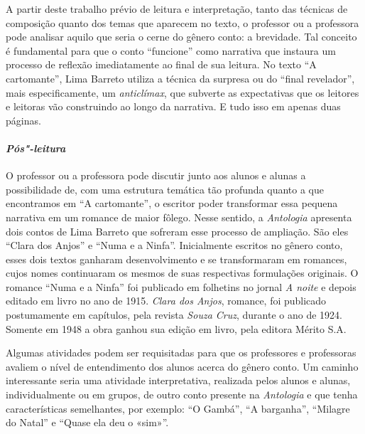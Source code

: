 \documentclass[11pt]{extarticle}
\begin{document}
A partir deste trabalho prévio de leitura e interpretação, tanto das
técnicas de composição quanto dos temas que aparecem no texto, o
professor ou a professora pode analisar aquilo que seria o cerne do
gênero conto: a brevidade. Tal conceito é fundamental para que o conto
``funcione'' como narrativa que instaura um processo de reflexão
imediatamente ao final de sua leitura. No texto ``A
cartomante'', Lima Barreto utiliza a técnica da surpresa ou do ``final
revelador'', mais especificamente, um \emph{anticlímax}, que subverte as
expectativas que os leitores e leitoras vão construindo ao longo da
narrativa. E tudo isso em apenas duas páginas.



\paragraph{\textit{Pós"-leitura}}

O professor ou a professora pode discutir junto aos alunos e alunas a
possibilidade de, com uma estrutura temática tão profunda quanto a que
encontramos em {``A cartomante''}, o escritor poder transformar 
essa pequena narrativa em um romance de maior fôlego. Nesse
sentido, a \emph{Antologia} apresenta dois contos de Lima Barreto que
sofreram esse processo de ampliação. São eles ``Clara dos
Anjos'' e ``Numa e a Ninfa''. Inicialmente escritos no
gênero conto, esses dois textos ganharam desenvolvimento e se
transformaram em romances, cujos nomes continuaram os mesmos de suas
respectivas formulações originais. O romance ``Numa e a Ninfa'' foi
publicado em folhetins no jornal \emph{A noite} e depois editado em
livro no ano de 1915. \emph{Clara dos Anjos}, romance, foi publicado
postumamente em capítulos, pela revista \emph{Souza Cruz}, durante o ano
de 1924. Somente em 1948 a obra ganhou sua edição em livro, pela editora
Mérito S.A.

Algumas atividades podem ser requisitadas para que os professores e
professoras avaliem o nível de entendimento dos alunos acerca do gênero
conto. Um caminho interessante seria uma atividade interpretativa,
realizada pelos alunos e alunas, individualmente ou em grupos, de outro
conto presente na \emph{Antologia} e que tenha características
semelhantes, por exemplo: ``O Gambá'', ``A
barganha'', ``Milagre do Natal'' e ``Quase ela
deu o «sim»''.
\end{document}
